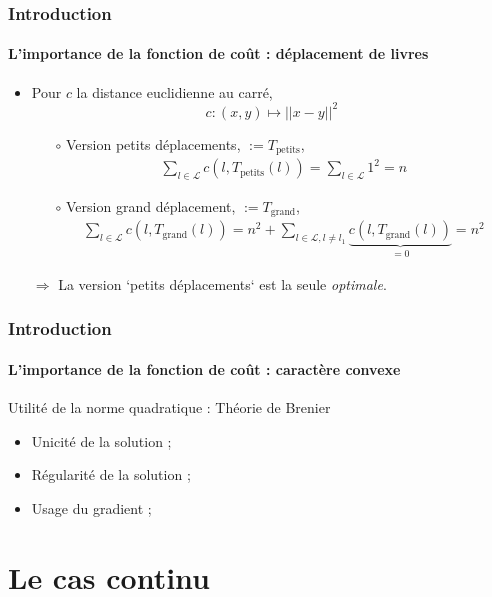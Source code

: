 \documentclass{beamer}
\begin{document}
\begin{frame}
	\frametitle{Introduction}
	\framesubtitle{L'importance de la fonction de coût : déplacement de livres} 
	\begin{itemize}
		\item Pour $c$ la distance euclidienne au carré, \[c : (x,y) \mapsto ||x-y||^2\]
		\begin{itemize}
			\item[$\circ$] Version petits déplacements, $:= T_\text{petits}$, \begin{align*}
				\sum_{l \in \mathcal{L}} c(l,T_\text{petits}(l)) = \sum_{l \in \mathcal{L}} 1^2 = n
			\end{align*}
			\item[$\circ$] Version grand déplacement, $:=T_\text{grand}$, \begin{align*}
				\sum_{l \in \mathcal{L}} c(l,T_\text{grand}(l)) = n^2 + \sum_{l \in \mathcal{L}, l \neq l_1}\underbrace{c(l,T_\text{grand}(l))}_{=0} = n^2
			\end{align*}
		\end{itemize}
		\small $\Rightarrow$ La version ‘petits déplacements‘ est la seule \emph{optimale}.
	\end{itemize}
		

\end{frame}


\begin{frame}
	\frametitle{Introduction}
	\framesubtitle{L'importance de la fonction de coût : caractère convexe}
	Utilité de la norme quadratique : Théorie de Brenier 
	\begin{itemize}
		\item Unicité de la solution ;
		\item Régularité de la solution ;
		\item Usage du gradient ;	
	\end{itemize} 
\end{frame}


\section{Le cas continu}
\end{document}
